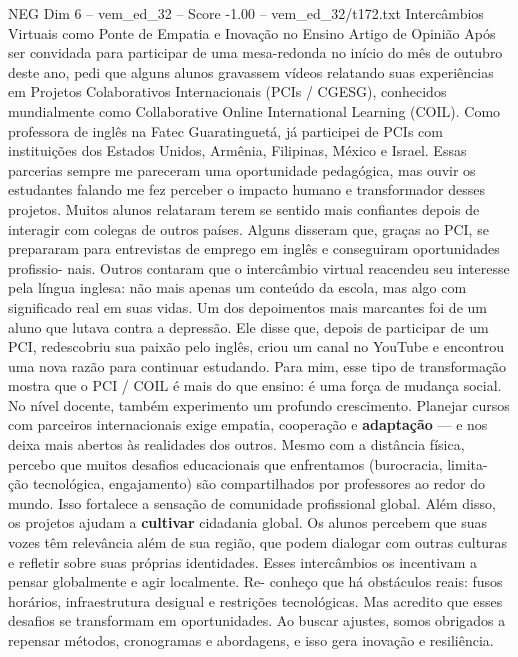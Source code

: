 \begin{textsample}{NEG Dim 6 – vem\_ed\_32 – Score -1.00 – vem\_ed\_32/t172.txt}  \label{ex:f6_neg_152}
Intercâmbios Virtuais como Ponte de Empatia e Inovação no Ensino Artigo de Opinião Após ser convidada para participar de uma mesa-redonda no início do mês de outubro deste ano, pedi que alguns alunos gravassem vídeos relatando suas experiências em Projetos Colaborativos Internacionais (PCIs / CGESG), conhecidos mundialmente como Collaborative Online International Learning (COIL).
Como professora de inglês na Fatec Guaratinguetá, já participei de PCIs com instituições dos Estados Unidos, Armênia, Filipinas, México e Israel.
Essas parcerias sempre me pareceram uma oportunidade pedagógica, mas ouvir os estudantes falando me fez perceber o impacto humano e transformador desses projetos.
Muitos alunos relataram terem se sentido mais confiantes depois de interagir com colegas de outros países.
Alguns disseram que, graças ao PCI, se prepararam para entrevistas de emprego em inglês e conseguiram oportunidades profissio- nais.
Outros contaram que o intercâmbio virtual reacendeu seu interesse pela língua inglesa: não mais apenas um conteúdo da escola, mas algo com significado real em suas vidas.
Um dos depoimentos mais marcantes foi de um aluno que lutava contra a depressão.
Ele disse que, depois de participar de um PCI, redescobriu sua paixão pelo inglês, criou um canal no YouTube e encontrou uma nova razão para continuar estudando.
Para mim, esse tipo de transformação mostra que o PCI / COIL é mais do que ensino: é uma força de mudança social.
No nível docente, também experimento um profundo crescimento.
Planejar cursos com parceiros internacionais exige empatia, cooperação e \textbf{adaptação} — e nos deixa mais abertos às realidades dos outros.
Mesmo com a distância física, percebo que muitos desafios educacionais que enfrentamos (burocracia, limita- ção tecnológica, engajamento) são compartilhados por professores ao redor do mundo.
Isso fortalece a sensação de comunidade profissional global.
Além disso, os projetos ajudam a \textbf{cultivar} cidadania global.
Os alunos percebem que suas vozes têm relevância além de sua região, que podem dialogar com outras culturas e refletir sobre suas próprias identidades.
Esses intercâmbios os incentivam a pensar globalmente e agir localmente.
Re- conheço que há obstáculos reais: fusos horários, infraestrutura desigual e restrições tecnológicas.
Mas acredito que esses desafios se transformam em oportunidades.
Ao buscar ajustes, somos obrigados a repensar métodos, cronogramas e abordagens, e isso gera inovação e resiliência.

\end{textsample}
